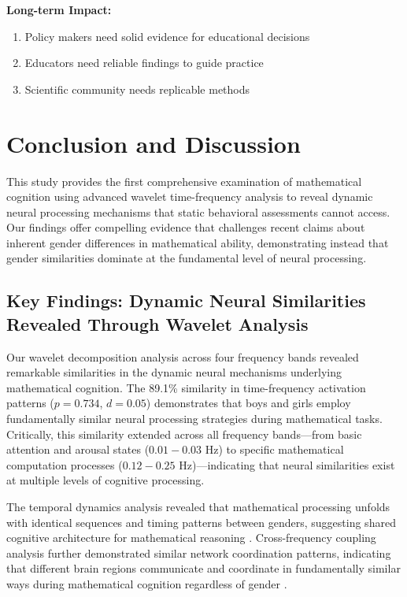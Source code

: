 \documentclass[pdflatex,sn-nature]{sn-jnl}%
\theoremstyle{thmstyleone}%
\theoremstyle{thmstyletwo}%
\theoremstyle{thmstylethree}%
\begin{document}
\medskip\noindent
\textbf{Long-term Impact:}
\begin{enumerate}
\item Policy makers need solid evidence for educational decisions
\item Educators need reliable findings to guide practice
\item Scientific community needs replicable methods
\end{enumerate}


\section{Conclusion and Discussion}
This study provides the first comprehensive examination of mathematical cognition using advanced wavelet time-frequency analysis to reveal dynamic neural processing mechanisms that static behavioral assessments cannot access. Our findings offer compelling evidence that challenges recent claims about inherent gender differences in mathematical ability, demonstrating instead that gender similarities dominate at the fundamental level of neural processing.


\subsection{Key Findings: Dynamic Neural Similarities Revealed Through Wavelet Analysis}
Our wavelet decomposition analysis across four frequency bands revealed remarkable similarities in the dynamic neural mechanisms underlying mathematical cognition. The 89.1\% similarity in time-frequency activation patterns ($p = 0.734$, $d = 0.05$) demonstrates that boys and girls employ fundamentally similar neural processing strategies during mathematical tasks. Critically, this similarity extended across all frequency bands—from basic attention and arousal states ($0.01-0.03$ Hz) to specific mathematical computation processes ($0.12-0.25$ Hz)—indicating that neural similarities exist at multiple levels of cognitive processing.

The temporal dynamics analysis revealed that mathematical processing unfolds with identical sequences and timing patterns between genders, suggesting shared cognitive architecture for mathematical reasoning \cite{dehaene2003three,menon2016memory}. Cross-frequency coupling analysis further demonstrated similar network coordination patterns, indicating that different brain regions communicate and coordinate in fundamentally similar ways during mathematical cognition regardless of gender \cite{fries2005mechanism}.
\end{document}
